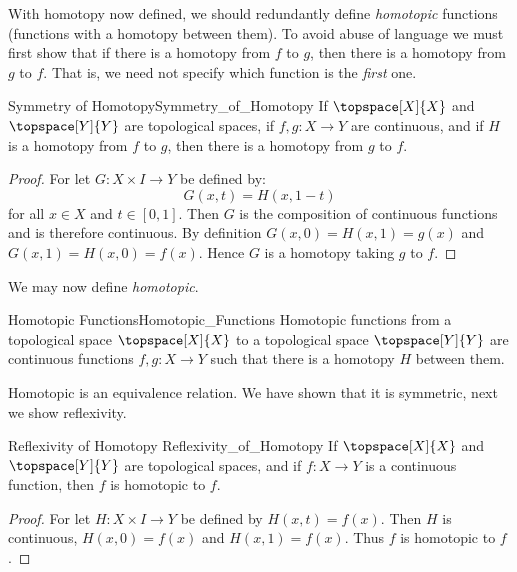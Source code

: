         With homotopy now defined, we should redundantly define
        \textit{homotopic} functions (functions with a homotopy between
        them). To avoid abuse of language we must first show that if
        there is a homotopy from $f$ to $g$, then there is a homotopy
        from $g$ to $f$. That is, we need not specify which function is
        the \textit{first} one.
        \begin{ltheorem}{Symmetry of Homotopy}{Symmetry_of_Homotopy}
            If $\topspace[X]{X}$ and $\topspace[Y]{Y}$ are topological
            spaces, if $f,g:X\rightarrow{Y}$ are continuous, and if $H$
            is a homotopy from $f$ to $g$, then there is a homotopy
            from $g$ to $f$.
        \end{ltheorem}
        \begin{proof}
            For let $G:X\times{I}\rightarrow{Y}$ be defined by:
            \begin{equation}
                G(x,t)=H(x,1-t)
            \end{equation}
            for all $x\in{X}$ and $t\in[0,1]$. Then $G$ is the
            composition of continuous functions and is therefore
            continuous. By definition $G(x,0)=H(x,1)=g(x)$ and
            $G(x,1)=H(x,0)=f(x)$. Hence $G$ is a homotopy taking $g$ to
            $f$.
        \end{proof}
        We may now define \textit{homotopic}.
        \begin{fdefinition}{Homotopic Functions}{Homotopic_Functions}
            Homotopic functions from a topological space
            $\topspace[X]{X}$ to a topological space $\topspace[Y]{Y}$
            are continuous functions $f,g:{X}\rightarrow{Y}$ such that
            there is a homotopy $H$ between them.
        \end{fdefinition}
        Homotopic is an equivalence relation. We have shown that it is
        symmetric, next we show reflexivity.
        \begin{ltheorem}{Reflexivity of Homotopy}
                        {Reflexivity_of_Homotopy}
            If $\topspace[X]{X}$ and $\topspace[Y]{Y}$ are topological
            spaces, and if $f:X\rightarrow{Y}$ is a continuous function,
            then $f$ is homotopic to $f$.
        \end{ltheorem}
        \begin{proof}
            For let $H:X\times{I}\rightarrow{Y}$ be defined by
            $H(x,t)=f(x)$. Then $H$ is continuous, $H(x,0)=f(x)$ and
            $H(x,1)=f(x)$. Thus $f$ is homotopic to $f$.
        \end{proof}
